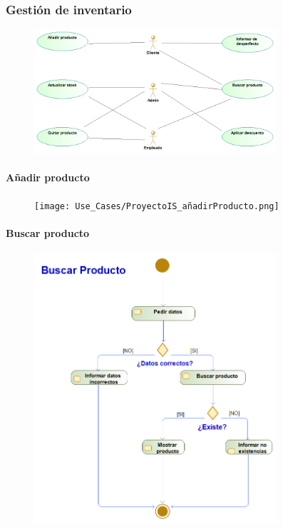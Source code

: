\subsubsection{Gestión de inventario}
\begin{figure}[H]
    \centering
    \includegraphics[width = 0.8\textwidth]{Use_Cases/gestion_de_inventario.png}
\end{figure}
\paragraph{Añadir producto}
\begin{figure}[H]
    \centering
    \texttt{[image: Use\_Cases/ProyectoIS\_añadirProducto.png]}
\end{figure}
\paragraph{Buscar producto}
\begin{figure}[H]
    \centering
    \includegraphics[width=0.8\textwidth]{Use_Cases/ProyectoIS_BuscarProducto.png}
\end{figure}
